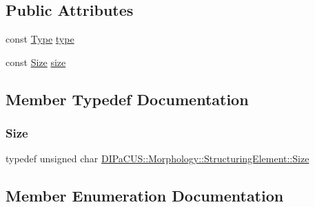 \subsection*{Public Attributes}
\begin{DoxyCompactItemize}
\item 
const \hyperlink{structDIPaCUS_1_1Morphology_1_1StructuringElement_a266d1fadc80f8b6ead0b9a38046db1a9}{Type} \hyperlink{structDIPaCUS_1_1Morphology_1_1StructuringElement_aea9961571fdde31c048b2b1bd59f296a}{type}
\item 
const \hyperlink{structDIPaCUS_1_1Morphology_1_1StructuringElement_ab516593fb61afbb06be48f756af85b56}{Size} \hyperlink{structDIPaCUS_1_1Morphology_1_1StructuringElement_ade1c5c9095630d3f404a75b97f1ae825}{size}
\end{DoxyCompactItemize}


\subsection{Member Typedef Documentation}
\mbox{\label{structDIPaCUS_1_1Morphology_1_1StructuringElement_ab516593fb61afbb06be48f756af85b56}} 
\subsubsection{\texorpdfstring{Size}{Size}}
{\footnotesize\ttfamily typedef unsigned char \hyperlink{structDIPaCUS_1_1Morphology_1_1StructuringElement_ab516593fb61afbb06be48f756af85b56}{D\+I\+Pa\+C\+U\+S\+::\+Morphology\+::\+Structuring\+Element\+::\+Size}}



\subsection{Member Enumeration Documentation}
\mbox{\label{structDIPaCUS_1_1Morphology_1_1StructuringElement_a266d1fadc80f8b6ead0b9a38046db1a9}} 
